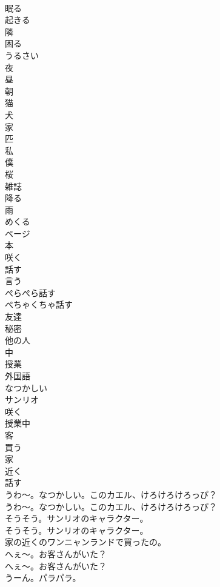 \documentclass[8pt]{extreport}
\begin{document}
\begin{CJK}{UTF8}{min}
\\	眠る
\\	起きる
\\	隣
\\	困る
\\	うるさい
\\	夜
\\	昼
\\	朝
\\	猫
\\	犬
\\	家
\\	匹
\\	私
\\	僕
\\	桜
\\	雑誌
\\	降る
\\	雨
\\	めくる
\\	ページ
\\	本
\\	咲く
\\	話す
\\	言う
\\	ぺらぺら話す
\\	ぺちゃくちゃ話す
\\	友達
\\	秘密
\\	他の人
\\	中
\\	授業
\\	外国語
\\	なつかしい
\\	サンリオ
\\	咲く
\\	授業中
\\	客
\\	買う
\\	家
\\	近く
\\	話す
\\	うわ～。なつかしい。このカエル、けろけろけろっぴ？	
\\	うわ～。なつかしい。このカエル、けろけろけろっぴ？ 
\\	そうそう。サンリオのキャラクター。	
\\	そうそう。サンリオのキャラクター。 
\\	家の近くのワンニャンランドで買ったの。 
\\	へぇ～。お客さんがいた？	
\\	へぇ～。お客さんがいた？ 
\\	うーん。パラパラ。	

\end{CJK}
\end{document}
